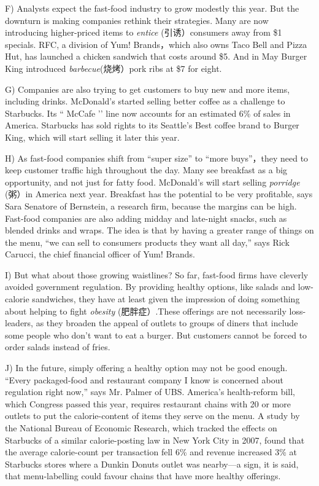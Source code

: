 \documentclass[UTF8,11pt]{ctexart}
\begin{document}
F) Analysts expect the fast-food industry to grow modestly this year. But the downturn is making companies rethink their strategies. Many are now introducing higher-priced items to\textit{ entice} (引诱）consumers away from \$1 specials. RFC, a division of Yum! Brands，which also owns Taco Bell and Pizza Hut, has launched a chicken sandwich that costs around \$5. And in May Burger King introduced\textit{ barbecue}(烧烤）pork ribs at \$7 for eight.


G) Companies are also trying to get customers to buy new and more items, including drinks. McDonald’s started selling better coffee as a challenge to Starbucks. Its “ McCafe ’’ line now accounts for an estimated 6\% of sales in America. Starbucks has sold rights to its Seattle’s Best coffee brand to Burger King, which will start selling it later this year.


H) As fast-food companies shift from “super size” to “more buys”，they need to keep customer traffic high throughout the day. Many see breakfast as a big opportunity, and not just for fatty food. McDonald’s will start selling\textit{ porridge} (粥）in America next year. Breakfast has the potential to be very profitable, says Sara Senatore of Bernstein, a research firm, because the margins can be high. Fast-food companies are also adding midday and late-night snacks, such as blended drinks and wraps. The idea is that by having a greater range of things on the menu, “we can sell to consumers products they want all day,” says Rick Carucci, the chief financial officer of Yum! Brands.


I) But what about those growing waistlines? So far, fast-food firms have cleverly avoided government regulation. By providing healthy options, like salads and low-calorie sandwiches, they have at least given the impression of doing something about helping to fight\textit{ obesity} (肥胖症）.These offerings are not necessarily loss-leaders, as they broaden the appeal of outlets to groups of diners that include some people who don’t want to eat a burger. But customers cannot be forced to order salads instead of fries.


J) In the future, simply offering a healthy option may not be good enough. “Every packaged-food and restaurant company I know is concerned about regulation right now,” says Mr. Palmer of UBS. America’s health-reform bill, which Congress passed this year, requires restaurant chains with 20 or more outlets to put the calorie-content of items they serve on the menu. A study by the National Bureau of Economic Research, which tracked the effects on Starbucks of a similar calorie-posting law in New York City in 2007, found that the average calorie-count per transaction fell 6\% and revenue increased 3\% at Starbucks stores where a Dunkin Donuts outlet was nearby—a sign, it is said, that menu-labelling could favour chains that have more healthy offerings.
\end{document}
